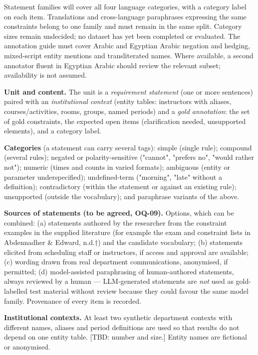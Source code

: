 \documentclass[
  11pt,a4paper,oneside]{report}
\begin{document}
Statement families will cover all four language categories, with a category label on each item. Translations and cross-language paraphrases expressing the same constraints belong to one family and must remain in the same split. Category sizes remain undecided; no dataset has yet been completed or evaluated. The annotation guide must cover Arabic and Egyptian Arabic negation and hedging, mixed-script entity mentions and transliterated names. Where available, a second annotator fluent in Egyptian Arabic should review the relevant subset; availability is not assumed.

\textbf{Unit and content.} The unit is a \emph{requirement statement}
(one or more sentences) paired with an \emph{institutional context}
(entity tables: instructors with aliases, courses/activities, rooms,
groups, named periods) and a \emph{gold annotation}: the set of gold
constraints, the expected open items (clarification needed, unsupported
elements), and a category label.

\textbf{Categories} (a statement can carry several tags): simple (single
rule); compound (several rules); negated or polarity-sensitive
("cannot", "prefers no", "would rather not"); numeric (times and counts
in varied formats); ambiguous (entity or parameter underspecified);
undefined-term ("morning", "late" without a definition); contradictory
(within the statement or against an existing rule); unsupported (outside
the vocabulary); and paraphrase variants of the above.

\textbf{Sources of statements (to be agreed, OQ-09).} Options, which can
be combined: (a) statements authored by the researcher from the
constraint examples in the supplied literature (for example the exam and
constraint lists in Abdennadher \& Edward, n.d.†) and the candidate vocabulary; (b) statements elicited
from scheduling staff or instructors, if access and approval are
available; (c) wording drawn from real department communications,
anonymised, if permitted; (d) model-assisted paraphrasing of
human-authored statements, always reviewed by a human --- LLM-generated
statements are \emph{not} used as gold-labelled test material without
review because they could favour the same model family. Provenance of
every item is recorded.

\textbf{Institutional contexts.} At least two synthetic department
contexts with different names, aliases and period definitions are used
so that results do not depend on one entity table. {[}TBD: number and
size.{]} Entity names are fictional or anonymised.
\end{document}
